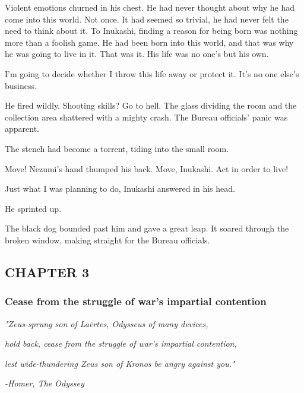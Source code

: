 Violent emotions churned in his chest. He had never thought about why he
had come into this world. Not once. It had seemed so trivial, he had
never felt the need to think about it. To Inukashi, finding a reason for
being born was nothing more than a foolish game. He had been born into
this world, and that was why he was going to live in it. That was it.
His life was no one's but his own.

I'm going to decide whether I throw this life away or protect it. It's
no one else's business.

He fired wildly. Shooting skills? Go to hell. The glass dividing the
room and the collection area shattered with a mighty crash. The Bureau
officials' panic was apparent.

The stench had become a torrent, tiding into the small room.

Move! Nezumi's hand thumped his back. Move, Inukashi. Act in order to
live!

Just what I was planning to do, Inukashi answered in his head.

He sprinted up.

The black dog bounded past him and gave a great leap. It soared through
the broken window, making straight for the Bureau officials.

\hypertarget{index_split_037.htmlux5cux23calibre_pb_68}{}

\protect\hypertarget{index_split_067.html}{}{}

\hypertarget{index_split_067.htmlux5cux23calibre_pb_0}{}

\hypertarget{index_split_067.htmlux5cux23calibre_toc_4}{%
\subsection{CHAPTER 3}\label{index_split_067.htmlux5cux23calibre_toc_4}}

\subsubsection{Cease from the struggle of war's impartial contention}

\emph{"Zeus-sprung son of Laërtes, Odysseus of many devices,}

\emph{hold back, cease from the struggle of war's impartial contention,}

\emph{lest wide-thundering Zeus son of Kronos be angry against you."}

\emph{-Homer, The Odyssey}

